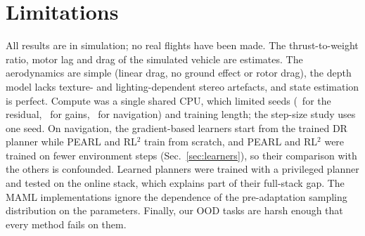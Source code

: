 \section{Limitations}\label{sec:limitations}

All results are in simulation; no real flights have been made. The thrust-to-weight ratio, motor lag and drag of the simulated vehicle are estimates. The aerodynamics are simple (linear drag, no ground effect or rotor drag), the depth model lacks texture- and lighting-dependent stereo artefacts, and state estimation is perfect. Compute was a single shared CPU, which limited seeds (\valSeedsRes\ for the residual, \valSeedsGain\ for gains, \valSeedsNav\ for navigation) and training length; the step-size study uses one seed. On navigation, the gradient-based learners start from the trained DR planner while PEARL and RL$^2$ train from scratch, and PEARL and RL$^2$ were trained on fewer environment steps (Sec.~\ref{sec:learners}), so their comparison with the others is confounded. Learned planners were trained with a privileged planner and tested on the online stack, which explains part of their full-stack gap. The MAML implementations ignore the dependence of the pre-adaptation sampling distribution on the parameters. Finally, our OOD tasks are harsh enough that every method fails on them.
